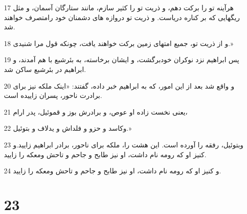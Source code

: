 \par 17 هرآینه تو را برکت دهم، و ذریت تو را کثیر سازم، مانند ستارگان آسمان، و مثل ریگهایی که بر کناره دریاست. و ذریت تو دروازه های دشمنان خود رامتصرف خواهند شد.
\par 18 و از ذریت تو، جمیع امتهای زمین برکت خواهند یافت، چونکه قول مرا شنیدی.»
\par 19 پس ابراهیم نزد نوکران خودبرگشت، و ایشان برخاسته، به بئرشبع با هم آمدند، و ابراهیم در بئرشبع ساکن شد.
\par 20 و واقع شد بعد از این امور، که به ابراهیم خبر داده، گفتند: «اینک ملکه نیز برای برادرت ناحور، پسران زاییده است.
\par 21 یعنی نخست زاده او عوص، و برادرش بوز و قموئیل، پدر ارام،
\par 22 وکاسد و حزو و فلداش و یدلاف و بتوئیل.»
\par 23 وبتوئیل، رفقه را آورده است. این هشت را، ملکه برای ناحور، برادر ابراهیم زایید.و کنیز او که رومه نام داشت، او نیز طابح و جاحم و تاحش ومعکه را زایید.
\par 24 و کنیز او که رومه نام داشت، او نیز طابح و جاحم و تاحش ومعکه را زایید.
 
\chapter{23}


